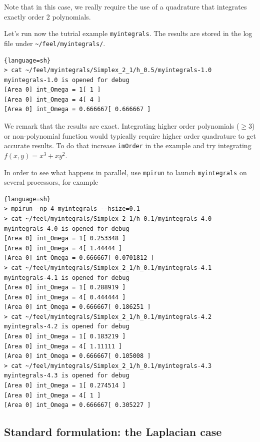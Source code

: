 

Note that in this case, we really require the use of a quadrature that
integrates exactly order 2 polynomials.

Let's run now the tutrial example \lstinline!myintegrals!. The results are stored
in the log file under \lstinline!~/feel/myintegrals/!.

\begin{lstlisting}{language=sh}
> cat ~/feel/myintegrals/Simplex_2_1/h_0.5/myintegrals-1.0
myintegrals-1.0 is opened for debug
[Area 0] int_Omega = 1[ 1 ]
[Area 0] int_Omega = 4[ 4 ]
[Area 0] int_Omega = 0.666667[ 0.666667 ]
\end{lstlisting}

We remark that the results are exact. Integrating higher order
polynomials ($\geq 3$) or non-polynomial function would typically
require higher order quadrature to get accurate results. To do that
increase \lstinline!imOrder! in the example and try integrating
$f(x,y)=x^3 + x y^2$.


In order to see what happens in parallel, use \lstinline!mpirun! to
launch \lstinline!myintegrals! on several processors, for example

\begin{lstlisting}{language=sh}
> mpirun -np 4 myintegrals --hsize=0.1
> cat ~/feel/myintegrals/Simplex_2_1/h_0.1/myintegrals-4.0
myintegrals-4.0 is opened for debug
[Area 0] int_Omega = 1[ 0.253348 ]
[Area 0] int_Omega = 4[ 1.44444 ]
[Area 0] int_Omega = 0.666667[ 0.0701812 ]
> cat ~/feel/myintegrals/Simplex_2_1/h_0.1/myintegrals-4.1
myintegrals-4.1 is opened for debug
[Area 0] int_Omega = 1[ 0.288919 ]
[Area 0] int_Omega = 4[ 0.444444 ]
[Area 0] int_Omega = 0.666667[ 0.186251 ]
> cat ~/feel/myintegrals/Simplex_2_1/h_0.1/myintegrals-4.2
myintegrals-4.2 is opened for debug
[Area 0] int_Omega = 1[ 0.183219 ]
[Area 0] int_Omega = 4[ 1.11111 ]
[Area 0] int_Omega = 0.666667[ 0.105008 ]
> cat ~/feel/myintegrals/Simplex_2_1/h_0.1/myintegrals-4.3
myintegrals-4.3 is opened for debug
[Area 0] int_Omega = 1[ 0.274514 ]
[Area 0] int_Omega = 4[ 1 ]
[Area 0] int_Omega = 0.666667[ 0.305227 ]
\end{lstlisting}

\subsection{Standard formulation: the Laplacian case}
\label{sec:defin-bilin-forms}
